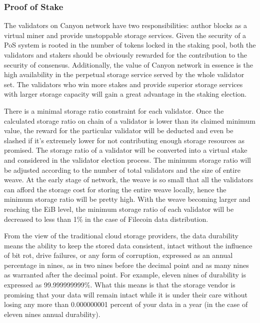 \documentclass[]{article}
\newcounter{subsubsubsection}[subsubsection]
\begin{document}
\subsubsection{Proof of Stake}


The validators on Canyon network have two responsibilities: author blocks as a virtual miner and provide unstoppable storage services. Given the security of a PoS system is rooted in the number of tokens locked in the staking pool, both the validators and stakers should be obviously rewarded for the contribution to the security of consensus. Additionally, the value of Canyon network in essence is the high availability in the perpetual storage service served by the whole validator set. The validators who win more stakes and provide superior storage services with larger storage capacity will gain a great advantage in the staking election.

There is a minimal storage ratio constraint for each validator. Once the calculated storage ratio on chain of a validator is lower than its claimed minimum value, the reward for the particular validator will be deducted and even be slashed if it's extremely lower for not contributing enough storage resources as promised. The storage ratio of a validator will be converted into a virtual stake and considered in the validator election process. The minimum storage ratio will be adjusted according to the number of total validators and the size of entire weave. At the early stage of network, the weave is so small that all the validators can afford the storage cost for storing the entire weave locally, hence the minimum storage ratio will be pretty high. With the weave becoming larger and reaching the EiB level, the minimum storage ratio of each validator will be decreased to less than 1\% in the case of Filecoin data distribution.

\label{data_durability}

From the view of the traditional cloud storage providers, the data durability means the ability to keep the stored data consistent, intact without the influence of bit rot, drive failures, or any form of corruption, expressed as an annual percentage in nines, as in two nines before the decimal point and as many nines as warranted after the decimal point. For example, eleven nines of durability is expressed as 99.999999999\%. What this means is that the storage vendor is promising that your data will remain intact while it is under their care without losing any more than 0.000000001 percent of your data in a year (in the case of eleven nines annual durability)\cite{storagedurability}.
\end{document}
